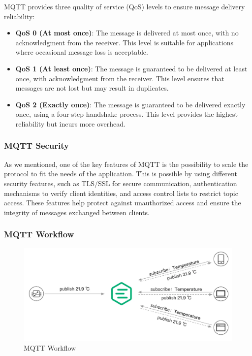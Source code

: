 MQTT provides three quality of service (QoS) levels to ensure message delivery reliability:
\begin{itemize}
    \item \textbf{QoS 0 (At most once)}: The message is delivered at most once, with no acknowledgment from the receiver. This level is suitable for applications where occasional message loss is acceptable.
    \item \textbf{QoS 1 (At least once)}: The message is guaranteed to be delivered at least once, with acknowledgment from the receiver. This level ensures that messages are not lost but may result in duplicates.
    \item \textbf{QoS 2 (Exactly once)}: The message is guaranteed to be delivered exactly once, using a four-step handshake process. This level provides the highest reliability but incurs more overhead.
\end{itemize}

\subsubsection{MQTT Security}

As we mentioned, one of the key features of MQTT is the possibility to scale the protocol to fit the needs of the application. This is possible by using different security features, such as TLS/SSL for secure communication, authentication mechanisms to verify client identities, and access control lists to restrict topic access. These features help protect against unauthorized access and ensure the integrity of messages exchanged between clients.

\subsubsection{MQTT Workflow}

\begin{figure}[h]
    \centering
    \includegraphics[width=\columnwidth]{img/mqtt-workflow-example.png}
    \caption{MQTT Workflow}
    \label{fig:mqtt-workflow}
\end{figure}

